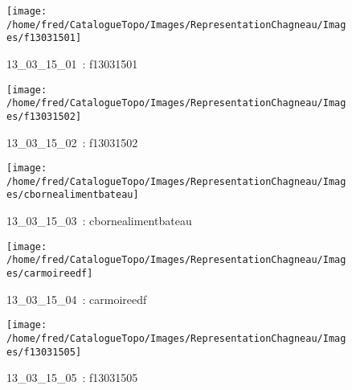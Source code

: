 \documentclass[12pt,titlepage]{book}
\begin{document}
\begin{figure}[h!]
  \hfill         %
  \begin{minipage}[t]{3cm}
    \begin{center}
      \texttt{[image: /home/fred/CatalogueTopo/Images/RepresentationChagneau/Images/f13031501]}
      \caption[~13\_03\_15\_01]{\small{13\_03\_15\_01~:} \tiny{f13031501}}\label{f13031501}
    \end{center}
  \end{minipage}
  \begin{minipage}[t]{3cm}
    \begin{center}
      \texttt{[image: /home/fred/CatalogueTopo/Images/RepresentationChagneau/Images/f13031502]}
      \caption[~13\_03\_15\_02]{\small{13\_03\_15\_02~:} \tiny{f13031502}}\label{f13031502}
    \end{center}
  \end{minipage}
  \begin{minipage}[t]{3cm}
    \begin{center}
      \texttt{[image: /home/fred/CatalogueTopo/Images/RepresentationChagneau/Images/cbornealimentbateau]}
      \caption[~13\_03\_15\_03]{\small{13\_03\_15\_03~:} \tiny{cbornealimentbateau}}\label{cbornealimentbateau}
    \end{center}
  \end{minipage}
  \begin{minipage}[t]{3cm}
    \begin{center}
      \texttt{[image: /home/fred/CatalogueTopo/Images/RepresentationChagneau/Images/carmoireedf]}
      \caption[~13\_03\_15\_04]{\small{13\_03\_15\_04~:} \tiny{carmoireedf}}\label{carmoireedf}
    \end{center}
  \end{minipage}
  \begin{minipage}[t]{3cm}
    \begin{center}
      \texttt{[image: /home/fred/CatalogueTopo/Images/RepresentationChagneau/Images/f13031505]}
      \caption[~13\_03\_15\_05]{\small{13\_03\_15\_05~:} \tiny{f13031505}}\label{f13031505}
    \end{center}
  \end{minipage}
  \begin{minipage}[t]{3cm}

\end{minipage}
\end{figure}
\end{document}
